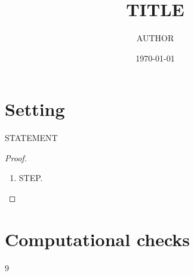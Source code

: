\documentclass[11pt]{article}
\title{TITLE}
\author{AUTHOR}
\date{\today}
\begin{document}
\maketitle

\section*{Setting}

\begin{theorem}\label{thm:main}
STATEMENT
\end{theorem}

\begin{proof}
\begin{enumerate}
  \item STEP. \own
\end{enumerate}
\end{proof}

\section*{Computational checks}

\begin{thebibliography}{9}
\end{thebibliography}
\end{document}
